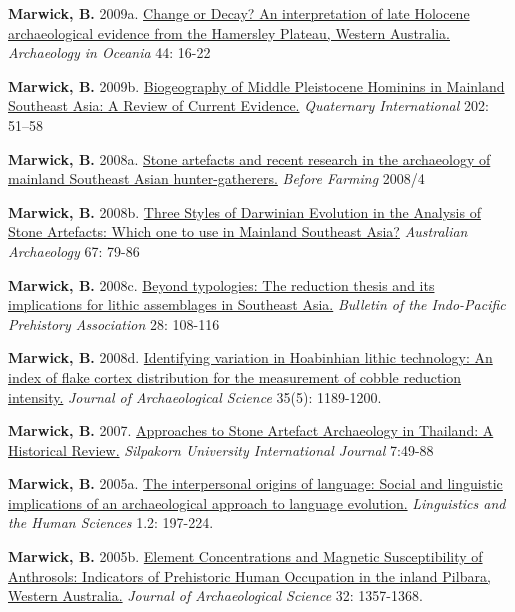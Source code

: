 \documentclass[11pt,article,oneside]{memoir}
\begin{document}
{{{{\ind \textbf{Marwick, B.} 2009a. \href{http://faculty.washington.edu/bmarwick/PDFs/Marwick_2009_AO_Pilbara.pdf}{Change or Decay? An interpretation of late Holocene archaeological evidence from the Hamersley Plateau, Western Australia.} \textit{Archaeology in Oceania} 44: 16-22

\ind \textbf{Marwick, B.}  2009b. \href{http://faculty.washington.edu/bmarwick/PDFs/Marwick_2009_QI.pdf}{Biogeography of Middle Pleistocene Hominins in Mainland Southeast Asia: A Review of Current Evidence.} \textit{Quaternary International} 202: 51–58

\ind \textbf{Marwick, B.} 2008a. \href{http://faculty.washington.edu/bmarwick/PDFs/Marwick_2008_Before_Farming.pdf}{Stone artefacts and recent research in the archaeology of mainland Southeast Asian hunter-gatherers.} \textit{Before Farming} 2008/4

\ind \textbf{Marwick, B.} 2008b. \href{http://faculty.washington.edu/bmarwick/PDFs/Marwick_2008_AA_3_Styles.pdf}{Three Styles of Darwinian Evolution in the Analysis of Stone Artefacts: Which one to use in Mainland Southeast Asia?} \textit{Australian Archaeology} 67: 79-86

\ind \textbf{Marwick, B.} 2008c. \href{http://faculty.washington.edu/bmarwick/PDFs/Marwick_2008_BIPPA.pdf}{Beyond typologies: The reduction thesis and its implications for lithic assemblages in Southeast Asia.} \textit{Bulletin of the Indo-Pacific Prehistory Association} 28: 108-116

\ind \textbf{Marwick, B.} 2008d. \href{http://faculty.washington.edu/bmarwick/PDFs/Marwick_2008_JAS.pdf}{Identifying variation in Hoabinhian lithic technology: An index of flake cortex distribution for the measurement of cobble reduction intensity.} \textit{ Journal of Archaeological Science} 35(5): 1189-1200.

\ind \textbf{Marwick, B.} 2007. \href{http://faculty.washington.edu/bmarwick/PDFs/Marwick_2007_SIJ.pdf}{Approaches to Stone Artefact Archaeology in Thailand: A Historical Review.} \textit{Silpakorn University International Journal} 7:49-88

\ind \textbf{Marwick, B.} 2005a. \href{http://faculty.washington.edu/bmarwick/PDFs/Marwick_2005_LHE.pdf}{The interpersonal origins of language: Social and linguistic implications of an archaeological approach to language evolution.} \textit{Linguistics and the Human Sciences} 1.2: 197-224.

\ind \textbf{Marwick, B.} 2005b. \href{http://faculty.washington.edu/bmarwick/PDFs/Marwick_2005_JAS.pdf}{Element Concentrations and Magnetic Susceptibility of Anthrosols: Indicators of Prehistoric Human Occupation in the inland Pilbara, Western Australia.} \textit{Journal of Archaeological Science} 32: 1357-1368.

}}}}
\end{document}
